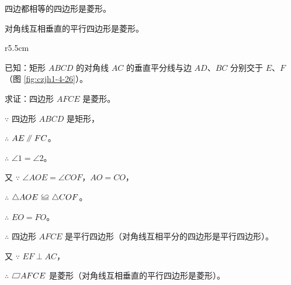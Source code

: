 \begin{dingli}[菱形判定定理1]
    四边都相等的四边形是菱形。
\end{dingli}

\begin{dingli}[菱形判定定理2]
    对角线互相垂直的平行四边形是菱形。
\end{dingli}


\begin{wrapfigure}[8]{r}{5.5cm}
    \centering
    
    \caption{}\label{fig:czjh1-4-26}
\end{wrapfigure}


\liti[0] 已知：矩形 $ABCD$ 的对角线 $AC$ 的垂直平分线与边 $AD$、$BC$ 分别交于 $E$、$F$（图 \ref{fig:czjh1-4-26}）。

求证：四边形 $AFCE$ 是菱形。

\zhengming $\because$ \quad 四边形 $ABCD$ 是矩形，

$\therefore$ \quad $AE \pingxing FC$。

$\therefore$ \quad $\angle 1 = \angle 2$。

又 $\because$ \quad $\angle AOE = \angle COF$，$AO = CO$，

$\therefore$ \quad $\triangle AOE \quandeng \triangle COF$。

$\therefore$ \quad $EO = FO$。

$\therefore$ \quad 四边形 $AFCE$ 是平行四边形（对角线互相平分的四边形是平行四边形）。

又 $\because$ \quad $EF \perp AC$，

$\therefore$ \quad $\pxsbx AFCE$ 是菱形（对角线互相垂直的平行四边形是菱形）。


\begin{lianxi}




\end{lianxi}

